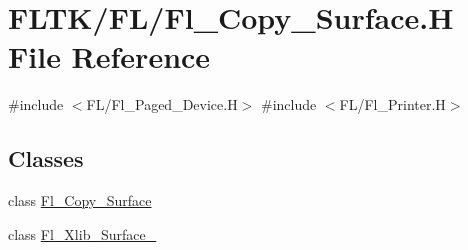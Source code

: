 \hypertarget{_fl___copy___surface_8_h}{}\section{F\+L\+T\+K/\+F\+L/\+Fl\+\_\+\+Copy\+\_\+\+Surface.H File Reference}
\label{_fl___copy___surface_8_h}
{\ttfamily \#include $<$F\+L/\+Fl\+\_\+\+Paged\+\_\+\+Device.\+H$>$}\newline
{\ttfamily \#include $<$F\+L/\+Fl\+\_\+\+Printer.\+H$>$}\newline
\subsection*{Classes}
\begin{DoxyCompactItemize}
\item 
class \hyperlink{class_fl___copy___surface}{Fl\+\_\+\+Copy\+\_\+\+Surface}
\item 
class \hyperlink{class_fl___xlib___surface__}{Fl\+\_\+\+Xlib\+\_\+\+Surface\+\_\+}
\end{DoxyCompactItemize}
